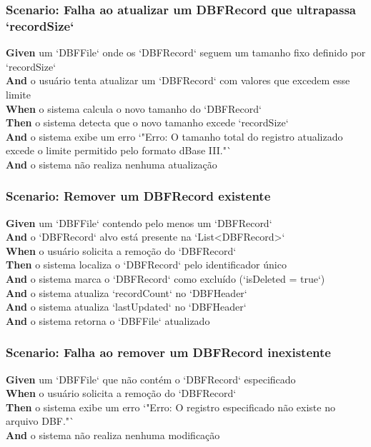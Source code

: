 \subsubsection{Scenario: Falha ao atualizar um DBFRecord que ultrapassa `recordSize`}
\textbf{Given} um `DBFFile` onde os `DBFRecord` seguem um tamanho fixo definido por `recordSize` \\
\textbf{And} o usuário tenta atualizar um `DBFRecord` com valores que excedem esse limite \\
\textbf{When} o sistema calcula o novo tamanho do `DBFRecord` \\
\textbf{Then} o sistema detecta que o novo tamanho excede `recordSize` \\
\textbf{And} o sistema exibe um erro `"Erro: O tamanho total do registro atualizado excede o limite permitido pelo formato dBase III."` \\
\textbf{And} o sistema não realiza nenhuma atualização

\subsubsection{Scenario: Remover um DBFRecord existente}
\textbf{Given} um `DBFFile` contendo pelo menos um `DBFRecord` \\
\textbf{And} o `DBFRecord` alvo está presente na `List<DBFRecord>` \\
\textbf{When} o usuário solicita a remoção do `DBFRecord` \\
\textbf{Then} o sistema localiza o `DBFRecord` pelo identificador único \\
\textbf{And} o sistema marca o `DBFRecord` como excluído (`isDeleted = true`) \\
\textbf{And} o sistema atualiza `recordCount` no `DBFHeader` \\
\textbf{And} o sistema atualiza `lastUpdated` no `DBFHeader` \\
\textbf{And} o sistema retorna o `DBFFile` atualizado

\subsubsection{Scenario: Falha ao remover um DBFRecord inexistente}
\textbf{Given} um `DBFFile` que não contém o `DBFRecord` especificado \\
\textbf{When} o usuário solicita a remoção do `DBFRecord` \\
\textbf{Then} o sistema exibe um erro `"Erro: O registro especificado não existe no arquivo DBF."` \\
\textbf{And} o sistema não realiza nenhuma modificação

